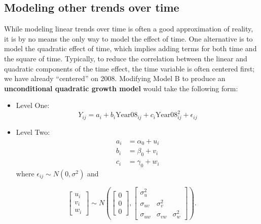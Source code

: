\documentclass[
]{krantz}
\begin{document}
\hypertarget{othertimetrends}{%
\subsection{Modeling other trends over time}\label{othertimetrends}}

While modeling linear trends over time is often a good approximation of reality, it is by no means the only way to model the effect of time. One alternative is to model the quadratic effect of time, which implies adding terms for both time and the square of time. Typically, to reduce the correlation between the linear and quadratic components of the time effect, the time variable is often centered first; we have already ``centered'' on 2008. Modifying Model B to produce an \textbf{unconditional quadratic growth model} would take the following form:

\begin{itemize}
\item
  Level One:
  \begin{equation*}
  Y_{ij}=a_{i}+b_{i}\textrm{Year08}_{ij}+c_{i}\textrm{Year08}^{2}_{ij} + \epsilon_{ij}
  \end{equation*}
\item
  Level Two:
  \begin{align*}
  a_{i} & = \alpha_{0} + u_{i}\\
  b_{i} & = \beta_{0} + v_{i}\\
  c_{i} & = \gamma_{0} + w_{i}
  \end{align*}
  where \(\epsilon_{ij}\sim N(0,\sigma^2)\) and
\end{itemize}

\[ \left[ \begin{array}{c}
            u_{i} \\ v_{i} \\ w_{i}
          \end{array}  \right] \sim N \left( \left[
          \begin{array}{c}
            0 \\ 0 \\ 0
          \end{array} \right], \left[
          \begin{array}{ccc}
            \sigma_{u}^{2} & & \\
            \sigma_{uv} & \sigma_{v}^{2} & \\
            \sigma_{uw} & \sigma_{vw} & \sigma_{w}^{2}
          \end{array} \right] \right) . \]
\end{document}
